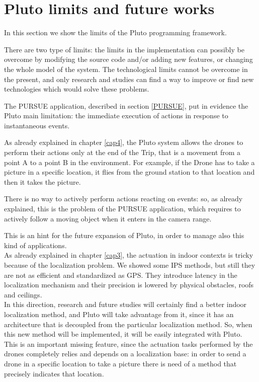 \newpage

\section{Pluto limits and future works}

In this section we show the limits of the Pluto programming framework.

There are two type of limits:
the limits in the implementation can possibly be overcome by modifying the source code and/or adding new features, or changing the whole model of the system.
The technological limits cannot be overcome in the present, and only research and studies can find a way to improve or find new technologies which would solve these problems.


The PURSUE application, described in section \ref{PURSUE}, put in evidence the Pluto main limitation: the immediate execution of actions in response to instantaneous events.

As already explained in chapter \ref{cap4}, the Pluto system allows the drones to perform their actions only at the end of the Trip, that is a movement from a point A to a point B in the environment.
For example, if the Drone has to take a picture in a specific location, it flies from the ground station to that location and then it takes the picture.

There is no way to actively perform actions reacting on events:
so, as already explained, this is the problem of the PURSUE application, which requires to actively follow a moving object when it enters in the camera range.

This is an hint for the future expansion of Pluto, in order to manage also this kind of applications.
\\

As already explained in chapter \ref{cap3}, the actuation in indoor contexts is tricky because of the localization problem.
We showed some IPS methods, but still they are not as efficient and standardized as GPS.
They introduce latency in the localization mechanism and their precision is lowered by physical obstacles, roofs and ceilings.
\\

In this direction, research and future studies will certainly find a better indoor localization method, and Pluto will take advantage from it, since it has an architecture that is decoupled from the particular localization method.
So, when this new method will be implemented, it will be easily integrated with Pluto.
This is an important missing feature, since the actuation tasks performed by the drones completely relies and depends on a localization base:
in order to send a drone in a specific location to take a picture there is need of a method that precisely indicates that location.
\\

